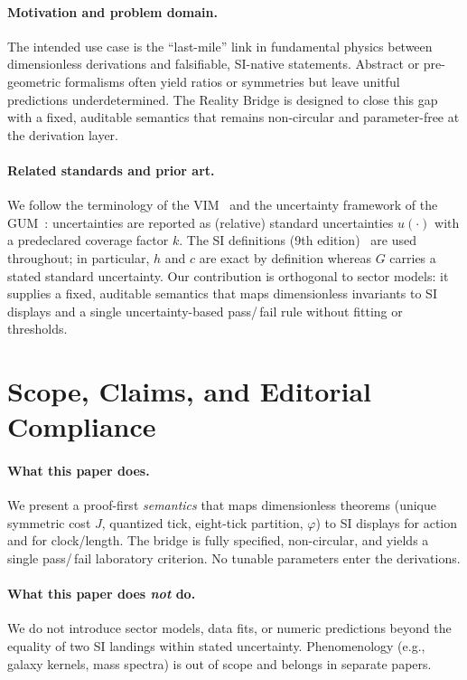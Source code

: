 \documentclass[11pt]{article}
\theoremstyle{plain}
\theoremstyle{definition}
\theoremstyle{remark}
\begin{document}
\paragraph{Motivation and problem domain.}
The intended use case is the “last-mile” link in fundamental physics between dimensionless derivations and falsifiable, SI-native statements. Abstract or pre-geometric formalisms often yield ratios or symmetries but leave unitful predictions underdetermined. The Reality Bridge is designed to close this gap with a fixed, auditable semantics that remains non-circular and parameter-free at the derivation layer.

\paragraph{Related standards and prior art.}
We follow the terminology of the VIM~\cite{JCGM200} and the uncertainty framework of the GUM~\cite{JCGM100}: uncertainties are reported as (relative) standard uncertainties \(u(\cdot)\) with a pre\-declared coverage factor \(k\). The SI definitions (9th edition)~\cite{SI9} are used throughout; in particular, \(h\) and \(c\) are exact by definition whereas \(G\) carries a stated standard uncertainty. Our contribution is orthogonal to sector models: it supplies a fixed, auditable semantics that maps dimensionless invariants to SI displays and a single uncertainty-based pass/\,fail rule without fitting or thresholds.

\section{Scope, Claims, and Editorial Compliance}

\paragraph{What this paper does.}
We present a proof-first \emph{semantics} that maps dimensionless theorems (unique symmetric cost \(J\), quantized tick, eight-tick partition, \(\varphi\)) to SI displays for action and for clock/length. The bridge is fully specified, non-circular, and yields a single pass/\,fail laboratory criterion. No tunable parameters enter the derivations.

\paragraph{What this paper does \emph{not} do.}
We do not introduce sector models, data fits, or numeric predictions beyond the equality of two SI landings within stated uncertainty. Phenomenology (e.g., galaxy kernels, mass spectra) is out of scope and belongs in separate papers.
\end{document}
